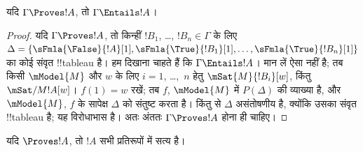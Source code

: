 \documentclass[../../../include/open-logic-section]{subfiles}
\begin{document}
\begin{cor}
यदि $\Gamma \Proves !A$, तो $\Gamma \Entails !A$।
\end{cor}

\begin{proof}
  यदि $\Gamma \Proves !A$, तो किन्हीं $!B_1$, \dots, $!B_n \in
  \Gamma$ के लिए $\Delta = \{\sFmla{\False}{!A}[1],
  \sFmla{\True}{!B_1}[1], \dots, \sFmla{\True}{!B_n}[1]\}$ का कोई
  संवृत !!{tableau} है। हम दिखाना चाहते हैं कि $\Gamma \Entails !A$। मान
  लें ऐसा नहीं है; तब किसी $\mModel{M}$ और $w$ के लिए $i=1$, \dots,~$n$
  हेतु $\mSat{M}{!B_i}[w]$, किंतु $\mSat/{M}{!A}[w]$। $f(1) = w$ रखें;
  तब $f$, $\mModel{M}$ में $P(\Delta)$ की व्याख्या है, और $\mModel{M}$,
  $f$ के सापेक्ष $\Delta$ को संतुष्ट करता है। किंतु
   से $\Delta$ असंतोषणीय है, क्योंकि उसका
  संवृत !!{tableau} है; यह विरोधाभास है। अतः अंततः $\Gamma \Proves !A$
  होना ही चाहिए।
\end{proof}

\begin{cor}
यदि $\Proves !A$, तो $!A$ सभी प्रतिरूपों में सत्य है।
\end{cor}
\end{document}
